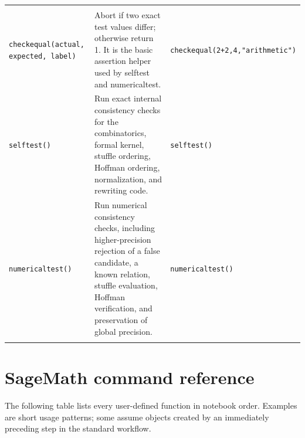 \documentclass[12pt]{amsproc}
\newcommand{\code}[1]{\nolinkurl{#1}}
\begin{document}
\begin{longtable}{@{}L{0.245\textwidth}L{0.440\textwidth}L{0.245\textwidth}@{}}
\addlinespace[2pt]
\addlinespace[3pt]\\[2pt]
\code{checkequal(actual, expected, label)} & Abort if two exact test values differ; otherwise return 1. It is the basic assertion helper used by selftest and numericaltest. & \code{checkequal(2+2,4,"arithmetic")} \\
\addlinespace[2pt]
\code{selftest()} & Run exact internal consistency checks for the combinatorics, formal kernel, stuffle ordering, Hoffman ordering, normalization, and rewriting code. & \code{selftest()} \\
\addlinespace[2pt]
\code{numericaltest()} & Run numerical consistency checks, including higher-precision rejection of a false candidate, a known relation, stuffle evaluation, Hoffman verification, and preservation of global precision. & \code{numericaltest()} \\
\addlinespace[2pt]
\bottomrule
\end{longtable}
\endgroup

\section{SageMath command reference}
The following table lists every user-defined function in notebook order. Examples are short usage patterns; some assume objects created by an immediately preceding step in the standard workflow.
\end{document}
